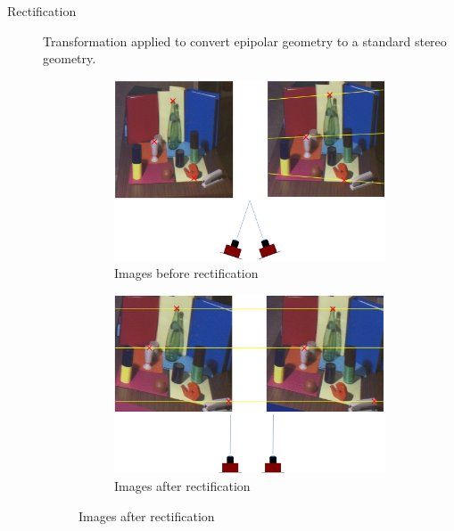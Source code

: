 \begin{description}
        \begin{description}
            \item[Rectification] 
                Transformation applied to convert epipolar geometry to a standard stereo geometry.
                \begin{figure}[H]
                    \centering
                    \begin{subfigure}{0.35\linewidth}
                        \centering
                        \includegraphics[width=\linewidth]{./img/rectification_no.png}
                        \caption{Images before rectification}
                    \end{subfigure}
                    \begin{subfigure}{0.35\linewidth}
                        \centering
                        \includegraphics[width=\linewidth]{./img/rectification_yes.png}
                        \caption{Images after rectification}
                    \end{subfigure}
                \end{figure}
        \end{description}
\end{description}


